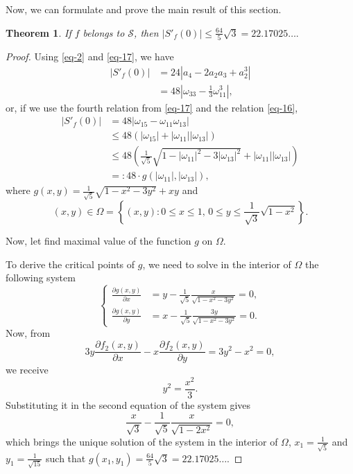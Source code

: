 \documentclass{amsart}
\newtheorem{thm}{Theorem}
\begin{document}
\medskip

Now, we can formulate and prove the main result of this section.

\begin{thm}\label{th5}
If $f$ belongs to $\mathcal{S}$, then $|S'_{f}(0)|\leq \frac{64}{5}\sqrt{3}=22.17025\ldots.$
\end{thm}

\begin{proof}
Using \eqref{eq-2} and \eqref{eq-17}, we have
\[
\begin{split}
|S'_{f}(0)|&=24|a_{4}-2a_{2}a_{3}+a_{2}^{3}|\\
&=48\left|\omega_{33}-\frac{1}{3}\omega_{11}^{3}\right|,
\end{split}
\]
or, if we use the fourth relation from \eqref{eq-17} and the relation \eqref{eq-16},
\[
\begin{split}
|S'_{f}(0)|&=48|\omega_{15}-\omega_{11}\omega_{13}|\\
&\leq48(|\omega_{15}|+|\omega_{11}||\omega_{13}|)\\
&\leq 48\left(\frac{1}{\sqrt{5}}\sqrt{1-|\omega_{11}|^2-3|\omega_{13}|^2}+|\omega_{11}||\omega_{13}|\right)\\
&=:48\cdot g(|\omega_{11}|,|\omega_{13}|),
\end{split}
\]
where
$g(x,y)=\frac{1}{\sqrt{5}}\sqrt{1-x^2-3y^2}+x y$ and
\[ (x,y)\in \Omega = \left\{(x,y) : 0\leq x \leq 1,\, 0\leq y\leq \frac{1}{\sqrt3}\sqrt{1-x^2} \right\}. \]

\medskip

Now, let find maximal value of the function $g$ on $\Omega$.

\medskip

To derive the critical points of $g$, we need to solve in the interior of $\Omega$ the following system
\[
\left\{
\begin{split}
\frac{\partial g(x,y)}{\partial x} &= y-\frac{1}{\sqrt{5} }\frac{x}{\sqrt{1-x^2-3 y^2}} = 0,\\
\frac{\partial g(x,y)}{\partial y} &= x-\frac{1}{\sqrt{5} }\frac{3 y}{\sqrt{1-x^2-3 y^2}} = 0.
\end{split}
\right.
\]
Now, from
\[3y\frac{\partial f_2(x,y)}{\partial x} - x \frac{\partial f_2(x,y)}{\partial y} =
3 y^2-x^2 = 0 , \]
we receive
\[y^2=\frac{x^2}{3}.\]
Substituting it in the second equation of the system gives
\[ \frac{x}{\sqrt{3}}-\frac{1}{\sqrt{5} }\frac{x}{\sqrt{1-2 x^2}} = 0,\]
which brings the unique solution of the system in the interior of $\Omega$, $x_1=\frac{1}{\sqrt5}$ and $y_1=\frac{1}{\sqrt{15}}$ such that $g(x_1,y_1)=\frac{64}{5}\sqrt{3}=22.17025\ldots$.


\end{proof}
\end{document}
